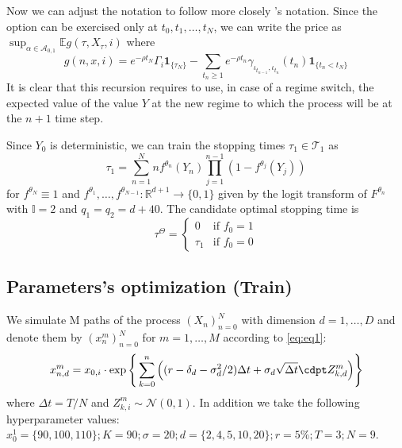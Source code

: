 \documentclass{article}
\begin{document}
Now we can adjust the notation to follow more closely \cite{becker2019deep}'s notation. Since the option can be exercised only at $t_0, t_1, \ldots, t_N$, we can write the price as $\sup_{\alpha \in \mathcal{A}_{0,1}} \mathbb{E} g(\tau, X_{\tau}, i)$ where
\begin{equation}
    g(n, x, i) = e^{-\rho t_N}\Gamma_{i}\mathbf{1}_{\{\tau_N \}} - \sum_{t_n \geq 1} e^{- \rho t_n} \gamma_{\iota_{t_{n-1}}, \iota_{t_n}}(t_n) \mathbf{1}_{\{t_n < t_N \}}
\end{equation}
It is clear that this recursion requires to use, in case of a regime switch, the expected value of the value $Y$ at the new regime to which the process will be at the $n+1$ time step. 

Since $Y_0$ is deterministic, we can train the stopping times $\tau_1 \in \mathcal{T}_1$ as
\begin{equation}
    \tau_{1} = \sum_{n=1}^N n f^{\theta_n}(Y_n) \prod _{j=1}^{n-1} (1-f^{\theta_j}(Y_j))
\end{equation}
for $f^{\theta_N} \equiv 1$ and $f^{\theta_1}, \ldots, f^{\theta_{N-1}} : \mathbb{R}^{d+1} \rightarrow \{0,1\}$ given by the logit transform of $F^{\theta_n}$ with $\mathbb{I}=2$ and $q_1=q_2 = d+40$. The candidate optimal stopping time is 
\begin{equation}
\tau^{\Theta} = \begin{cases}
0 & \text{if } f_0=1\\
\tau_1 & \text{if } f_0=0
      
    \end{cases}
\end{equation}



\subsection{Parameters's optimization (Train)}
We simulate M paths of the process $(X_n)_{n=0}^N$ with dimension $d=1, \ldots, D$ and denote them by $(x_n^m)_{n=0}^N$ for $m=1, \ldots, M$ according to \ref{eq:eq1}:
\begin{equation}
    x_{n,d}^m = x_{0,i} \cdot \exp \Bigg\{ \sum_{k=0}^n \Big( (r-\delta_d - \sigma_d^2 /2) \Delta t + \sigma_d \sqrt{\Delta t} \cdpt Z_{k,d}^m   \Big) \Bigg\}
\end{equation}
where $\Delta t = T/N$ and $Z_{k,i}^m \sim \mathcal{N}(0,1)$. In addition we take the following hyperparameter values: $x_0^1=\{90, 100, 110\}; K=90;\sigma = 20; d=\{2, 4, 5, 10, 20\}; r= 5\%; T=3;N=9$.
\end{document}
